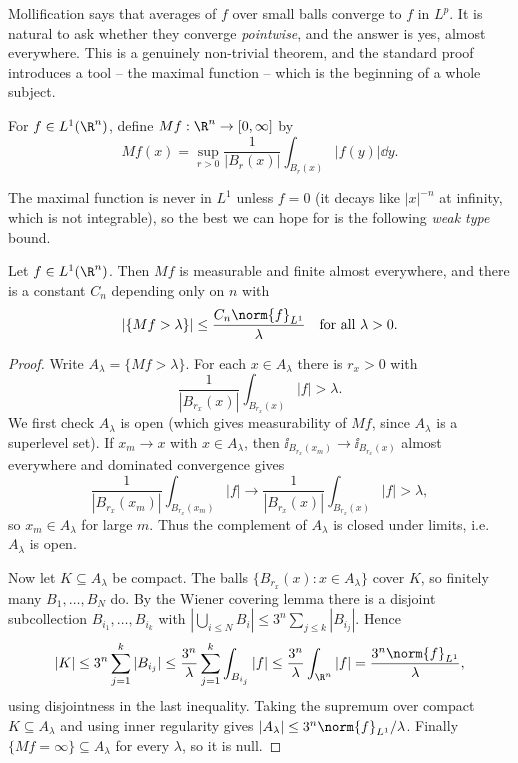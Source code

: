 Mollification says that averages of $f$ over small balls converge to $f$ in $L^p$. It is natural to ask whether they converge \emph{pointwise}, and the answer is yes, almost everywhere. This is a genuinely non-trivial theorem, and the standard proof introduces a tool -- the maximal function -- which is the beginning of a whole subject.

\begin{definition}
	For $f \in L^1(\R^n)$, define $Mf : \R^n \to [0,\infty]$ by
	$$Mf(x) = \sup_{r > 0} \frac{1}{|B_r(x)|} \int_{B_r(x)} |f(y)| \dd y.$$
\end{definition}

The maximal function is never in $L^1$ unless $f = 0$ (it decays like $|x|^{-n}$ at infinity, which is not integrable), so the best we can hope for is the following \emph{weak type} bound.

\begin{lemma}\label{aof-lem:maximal}
	Let $f \in L^1(\R^n)$. Then $Mf$ is measurable and finite almost everywhere, and there is a constant $C_n$ depending only on $n$ with
	$$\left| \{ Mf > \lambda\}\right| \le \frac{C_n \norm{f}_{L^1}}{\lambda} \quad \text{for all } \lambda > 0.$$
\end{lemma}

\begin{proof}
	Write $A_\lambda = \{Mf > \lambda\}$. For each $x \in A_\lambda$ there is $r_x > 0$ with
	$$\frac{1}{|B_{r_x}(x)|}\int_{B_{r_x}(x)} |f| > \lambda.$$
	We first check $A_\lambda$ is open (which gives measurability of $Mf$, since $A_\lambda$ is a superlevel set). If $x_m \to x$ with $x \in A_\lambda$, then $\ii_{B_{r_x}(x_m)} \to \ii_{B_{r_x}(x)}$ almost everywhere and dominated convergence gives
	$$\frac{1}{|B_{r_x}(x_m)|}\int_{B_{r_x}(x_m)} |f| \longrightarrow \frac{1}{|B_{r_x}(x)|}\int_{B_{r_x}(x)}|f| > \lambda,$$
	so $x_m \in A_\lambda$ for large $m$. Thus the complement of $A_\lambda$ is closed under limits, i.e.\ $A_\lambda$ is open.

	Now let $K \subseteq A_\lambda$ be compact. The balls $\{B_{r_x}(x) : x \in A_\lambda\}$ cover $K$, so finitely many $B_1, \dots, B_N$ do. By the Wiener covering lemma there is a disjoint subcollection $B_{i_1}, \dots, B_{i_k}$ with $\left| \bigcup_{i \le N} B_i \right| \le 3^n \sum_{j \le k} |B_{i_j}|$. Hence
	$$|K| \le 3^n \sum_{j=1}^k |B_{i_j}| \le \frac{3^n}{\lambda}\sum_{j=1}^k \int_{B_{i_j}}|f| \le \frac{3^n}{\lambda}\int_{\R^n}|f| = \frac{3^n \norm{f}_{L^1}}{\lambda},$$
	using disjointness in the last inequality. Taking the supremum over compact $K \subseteq A_\lambda$ and using inner regularity gives $|A_\lambda| \le 3^n \norm{f}_{L^1}/\lambda$. Finally $\{Mf = \infty\} \subseteq A_\lambda$ for every $\lambda$, so it is null.
\end{proof}

